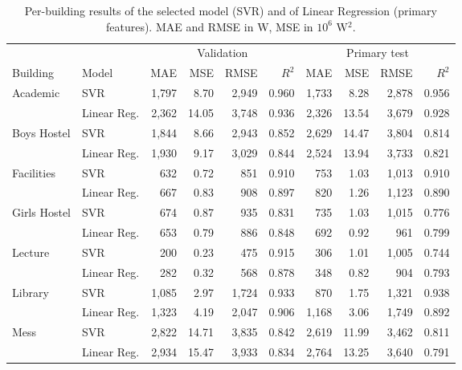 \documentclass[conference]{IEEEtran}
\begin{document}
\begin{table}[t]
\caption{Per-building results of the selected model (SVR) and of Linear Regression (primary features). MAE and RMSE in W, MSE in $10^6$ W$^2$.}\label{tab:pb}
\centering\scriptsize
\begin{tabular}{llrrrrrrrr}
\toprule
 & & \multicolumn{4}{c}{Validation} & \multicolumn{4}{c}{Primary test}\\
\cmidrule(lr){3-6}\cmidrule(lr){7-10}
Building & Model & MAE & MSE & RMSE & $R^2$ & MAE & MSE & RMSE & $R^2$\\
\midrule
Academic & SVR & 1{,}797 & 8.70 & 2{,}949 & 0.960 & 1{,}733 & 8.28 & 2{,}878 & 0.956 \\
 & Linear Reg. & 2{,}362 & 14.05 & 3{,}748 & 0.936 & 2{,}326 & 13.54 & 3{,}679 & 0.928 \\
Boys Hostel & SVR & 1{,}844 & 8.66 & 2{,}943 & 0.852 & 2{,}629 & 14.47 & 3{,}804 & 0.814 \\
 & Linear Reg. & 1{,}930 & 9.17 & 3{,}029 & 0.844 & 2{,}524 & 13.94 & 3{,}733 & 0.821 \\
Facilities & SVR & 632 & 0.72 & 851 & 0.910 & 753 & 1.03 & 1{,}013 & 0.910 \\
 & Linear Reg. & 667 & 0.83 & 908 & 0.897 & 820 & 1.26 & 1{,}123 & 0.890 \\
Girls Hostel & SVR & 674 & 0.87 & 935 & 0.831 & 735 & 1.03 & 1{,}015 & 0.776 \\
 & Linear Reg. & 653 & 0.79 & 886 & 0.848 & 692 & 0.92 & 961 & 0.799 \\
Lecture & SVR & 200 & 0.23 & 475 & 0.915 & 306 & 1.01 & 1{,}005 & 0.744 \\
 & Linear Reg. & 282 & 0.32 & 568 & 0.878 & 348 & 0.82 & 904 & 0.793 \\
Library & SVR & 1{,}085 & 2.97 & 1{,}724 & 0.933 & 870 & 1.75 & 1{,}321 & 0.938 \\
 & Linear Reg. & 1{,}323 & 4.19 & 2{,}047 & 0.906 & 1{,}168 & 3.06 & 1{,}749 & 0.892 \\
Mess & SVR & 2{,}822 & 14.71 & 3{,}835 & 0.842 & 2{,}619 & 11.99 & 3{,}462 & 0.811 \\
 & Linear Reg. & 2{,}934 & 15.47 & 3{,}933 & 0.834 & 2{,}764 & 13.25 & 3{,}640 & 0.791 \\

\bottomrule
\end{tabular}
\end{table}
\end{document}
